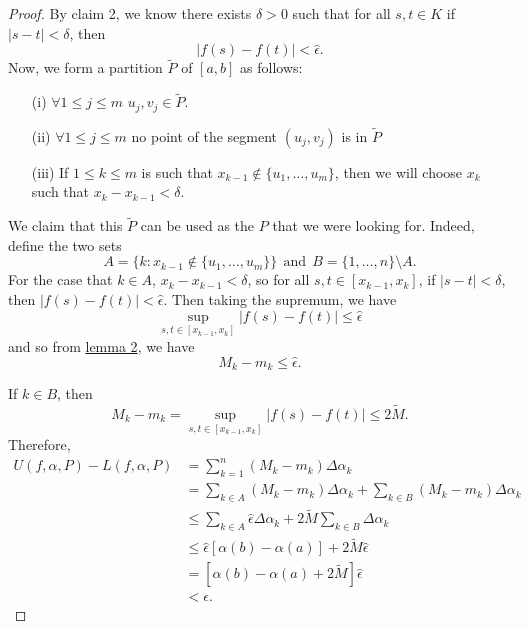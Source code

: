 \begin{proof}
By claim 2, we know there exists \( \delta > 0  \) such that for all \( s,t \in K  \) if \( | s - t  |  < \delta  \), then
\[  | f(s) - f(t) |  < \hat{\epsilon}. \]
Now, we form a partition \( \tilde{P}  \) of \( [a,b] \) as follows:
\begin{enumerate}
    \item[(i)] \( \forall 1 \leq j \leq m  \) \( {u}_{j}, {v}_{j} \in \tilde{P} \).
    \item[(ii)] \( \forall 1 \leq j \leq m  \) no point of the segment \( ({u}_{j}, {v}_{j}) \) is in \( \tilde{P} \)
    \item[(iii)] If \( 1 \leq k \leq m  \) is such that \( {x}_{k-1} \notin \{  {u}_{1}, \dots, {u}_{m} \}  \), then we will choose \( {x}_{k} \) such that \( {x}_{k } - {x}_{k-1} < \delta \). 
\end{enumerate}
We claim that this \( \tilde{P} \) can be used as the \( P  \) that we were looking for. Indeed, define the two sets
        \[ A = \{ k : {x}_{k-1} \notin \{ {u}_{1}, \dots, {u}_{m} \}  \} \ \ \text{and} \ \  B = \{ 1, \dots, n \}  \setminus  A.   \]
        For the case that \( k \in A  \), \( {x}_{k} - {x}_{k-1} < \delta \), so
        for all \( s,t \in [{x}_{k-1}, {x}_{k}] \), if \( | s- t  |  < \delta \), then \( | f(s) - f(t)  | < \hat{\epsilon} \). Then taking the supremum, we have 
        \[  \sup_{s,t \in [{x}_{k-1}, {x}_{k}]} | f(s) - f(t) |  \leq \hat{\epsilon} \]
        and so from {\hyperref[lemma 2]{lemma 2}}, we have  
        \[  {M}_{k } - {m}_{k } \leq \hat{\epsilon}. \]

    If \( k \in B \), then
    \[  {M}_{k } - {m}_{k } = \sup_{s,t \in [{x}_{k-1}, {x}_{k}]} | f(s) - f(t) |  \leq 2 \tilde{M}. \]
    Therefore, 
    \begin{align*}
        U(f,\alpha, P) - L(f,\alpha, P) &= \sum_{ k=1  }^{ n } ({M}_{k } - {m}_{k } ) \Delta {\alpha}_{k} \\
                                        &= \sum_{k \in A} ({M}_{k } - {m}_{k}) \Delta {\alpha}_{k } + \sum_{k \in B} ({M}_{k } - {m}_{k}) \Delta {\alpha}_{k } \\
                                        &\leq \sum_{k \in A} \hat{\epsilon} \Delta {\alpha}_{k } + 2 \tilde{M} \sum_{k \in B} \Delta {\alpha}_{k } \\ 
                                        &\leq \hat{\epsilon} [\alpha(b) - \alpha(a)] + 2 \tilde{M} \hat{\epsilon} \\
                                        &= [\alpha(b) - \alpha(a) + 2 \tilde{M}] \hat{\epsilon} \\
                                        &< \epsilon.
    \end{align*}
\end{proof}

